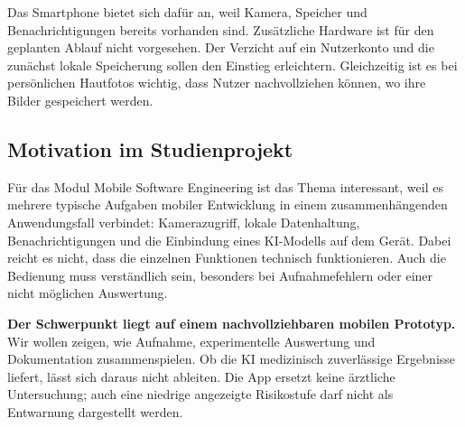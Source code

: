 Das Smartphone bietet sich dafür an, weil Kamera, Speicher und Benachrichtigungen bereits vorhanden sind. Zusätzliche Hardware ist für den geplanten Ablauf nicht vorgesehen. Der Verzicht auf ein Nutzerkonto und die zunächst lokale Speicherung sollen den Einstieg erleichtern. Gleichzeitig ist es bei persönlichen Hautfotos wichtig, dass Nutzer nachvollziehen können, wo ihre Bilder gespeichert werden.

\subsection{Motivation im Studienprojekt}

Für das Modul Mobile Software Engineering ist das Thema interessant, weil es mehrere typische Aufgaben mobiler Entwicklung in einem zusammenhängenden Anwendungsfall verbindet: Kamerazugriff, lokale Datenhaltung, Benachrichtigungen und die Einbindung eines KI-Modells auf dem Gerät. Dabei reicht es nicht, dass die einzelnen Funktionen technisch funktionieren. Auch die Bedienung muss verständlich sein, besonders bei Aufnahmefehlern oder einer nicht möglichen Auswertung.

\textbf{Der Schwerpunkt liegt auf einem nachvollziehbaren mobilen Prototyp.} Wir wollen zeigen, wie Aufnahme, experimentelle Auswertung und Dokumentation zusammenspielen. Ob die KI medizinisch zuverlässige Ergebnisse liefert, lässt sich daraus nicht ableiten. Die App ersetzt keine ärztliche Untersuchung; auch eine niedrige angezeigte Risikostufe darf nicht als Entwarnung dargestellt werden.
